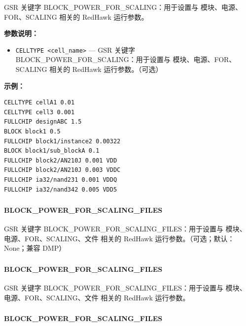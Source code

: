 GSR 关键字 BLOCK_POWER_FOR_SCALING：用于设置与 模块、电源、FOR、SCALING 相关的 RedHawk 运行参数。

\textbf{参数说明：}
\begin{itemize}
\item \texttt{CELLTYPE <cell\_name>} — GSR 关键字 BLOCK\_POWER\_FOR\_SCALING：用于设置与 模块、电源、FOR、SCALING 相关的 RedHawk 运行参数。（可选）
\end{itemize}

\textbf{示例：}
\begin{lstlisting}
CELLTYPE cellA1 0.01
CELLTYPE cell3 0.001
FULLCHIP designABC 1.5
BLOCK block1 0.5
FULLCHIP block1/instance2 0.00322
BLOCK block1/sub_blockA 0.1
FULLCHIP block2/AN210J 0.001 VDD
FULLCHIP block2/AN210J 0.003 VDDC
FULLCHIP ia32/nand231 0.001 VDDQ
FULLCHIP ia32/nand342 0.005 VDD5
\end{lstlisting}

\subsubsection{}
\paragraph*{BLOCK_POWER_FOR_SCALING_FILES}

GSR 关键字 BLOCK_POWER_FOR_SCALING_FILES：用于设置与 模块、电源、FOR、SCALING、文件 相关的 RedHawk 运行参数。（可选；默认：None；兼容 DMP）

\subsubsection{}
\paragraph*{BLOCK_POWER_FOR_SCALING_FILES}

GSR 关键字 BLOCK_POWER_FOR_SCALING_FILES：用于设置与 模块、电源、FOR、SCALING、文件 相关的 RedHawk 运行参数。

\subsubsection{}
\paragraph*{BLOCK_POWER_FOR_SCALING_FILES}

